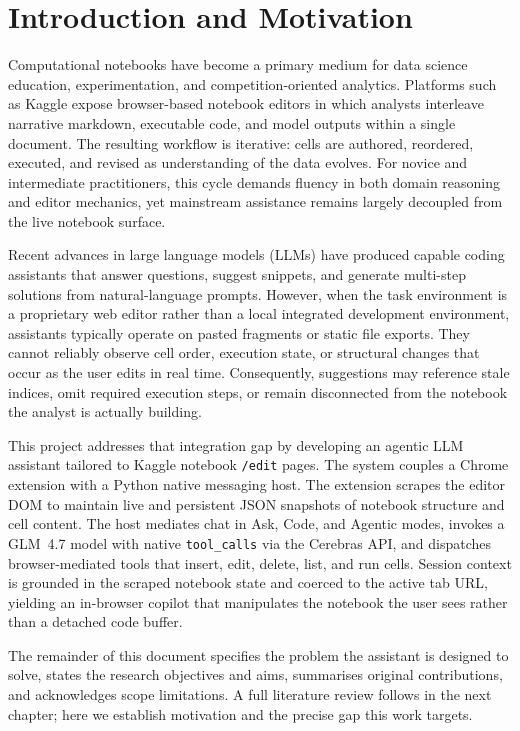 \chapter{Introduction and Motivation}
\label{c-intro}

Computational notebooks have become a primary medium for data science education, experimentation, and competition-oriented analytics. Platforms such as Kaggle expose browser-based notebook editors in which analysts interleave narrative markdown, executable code, and model outputs within a single document. The resulting workflow is iterative: cells are authored, reordered, executed, and revised as understanding of the data evolves. For novice and intermediate practitioners, this cycle demands fluency in both domain reasoning and editor mechanics, yet mainstream assistance remains largely decoupled from the live notebook surface.

Recent advances in large language models (\acp{LLM}) have produced capable coding assistants that answer questions, suggest snippets, and generate multi-step solutions from natural-language prompts. However, when the task environment is a proprietary web editor rather than a local integrated development environment, assistants typically operate on pasted fragments or static file exports. They cannot reliably observe cell order, execution state, or structural changes that occur as the user edits in real time. Consequently, suggestions may reference stale indices, omit required execution steps, or remain disconnected from the notebook the analyst is actually building.

This project addresses that integration gap by developing an agentic \ac{LLM} assistant tailored to Kaggle notebook \texttt{/edit} pages. The system couples a Chrome extension with a Python native messaging host. The extension scrapes the editor \ac{DOM} to maintain live and persistent JSON snapshots of notebook structure and cell content. The host mediates chat in Ask, Code, and Agentic modes, invokes a GLM~4.7 model with native \texttt{tool\_calls} via the Cerebras \ac{API}, and dispatches browser-mediated tools that insert, edit, delete, list, and run cells. Session context is grounded in the scraped notebook state and coerced to the active tab URL, yielding an in-browser copilot that manipulates the notebook the user sees rather than a detached code buffer.

The remainder of this document specifies the problem the assistant is designed to solve, states the research objectives and aims, summarises original contributions, and acknowledges scope limitations. A full literature review follows in the next chapter; here we establish motivation and the precise gap this work targets.


